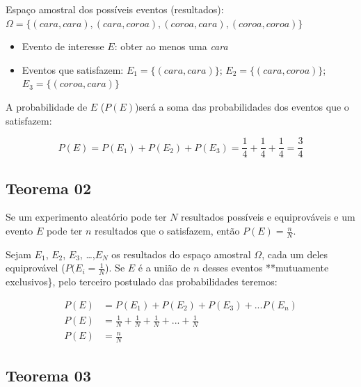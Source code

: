 \documentclass[
]{book}
\providecommand{\tightlist}{%
  \setlength{\itemsep}{0pt}\setlength{\parskip}{0pt}}
\begin{document}
\hfill\break

Espaço amostral dos possíveis eventos (resultados): \(\Omega = \{(cara, cara), (cara, coroa), (coroa, cara), (coroa, coroa)\}\)

\begin{itemize}
\tightlist
\item
  Evento de interesse \(E\): obter ao menos uma \emph{cara}
\item
  Eventos que satisfazem: \(E_{1} =\{(cara, cara)\}\); \(E_{2} =\{(cara, coroa)\}\); \(E_{3} =\{(coroa, cara)\}\)
\end{itemize}

A probabilidade de \(E\) (\(P(E)\))será a soma das probabilidades dos eventos que o satisfazem:

\[
P(E) = P(E_{1}) + P(E_{2}) + P(E_{3}) = \frac{1}{4} + \frac{1}{4} + \frac{1}{4} = \frac{3}{4}
\]

\hfill\break

\hypertarget{teorema-02}{%
\subsection{Teorema 02}\label{teorema-02}}

\hfill\break

Se um experimento aleatório pode ter \(N\) resultados possíveis e equiprováveis e um evento \(E\) pode ter \(n\) resultados que o satisfazem, então \(P(E) = \frac{n}{N}\).

\hfill\break

Sejam \(E_{1}\), \(E_{2}\), \(E_{3}\), \ldots,\(E_{N}\) os resultados do espaço amostral \(\Omega\), cada um deles equiprovável (\(P(E_{i} =\frac{1}{N}\)). Se \(E\) é a união de \(n\) desses eventos **mutuamente exclusivos\}, pelo terceiro postulado das probabilidades teremos:

\hfill\break

\begin{align*}
P(E) & = P(E_{1}) + P(E_{2}) + P(E_{3}) + ... P(E_{n}) \\
P(E) & = \frac{1}{N} + \frac{1}{N} +\frac{1}{N} +...+\frac{1}{N} \\
P(E) & = \frac{n}{N} 
\end{align*}

\hfill\break

\hypertarget{teorema-03}{%
\subsection{Teorema 03}\label{teorema-03}}
\end{document}
